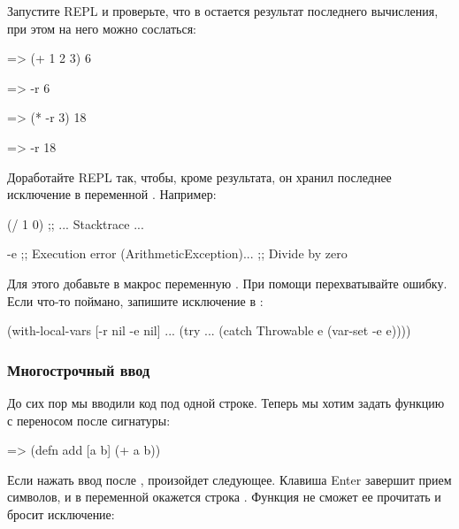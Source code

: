 Запустите REPL и проверьте, что в  остается результат последнего вычисления, при этом на него можно сослаться:

\begin{english}
  \begin{clojure}
=> (+ 1 2 3)
6

=> -r
6

=> (* -r 3)
18

=> -r
18
  \end{clojure}
\end{english}

Доработайте REPL так, чтобы, кроме результата, он хранил последнее исключение в переменной . Например:

\begin{english}
  \begin{clojure}
(/ 1 0)
;; ... Stacktrace ...

-e
;; Execution error (ArithmeticException)...
;; Divide by zero
  \end{clojure}
\end{english}

Для этого добавьте в макрос  переменную \code{[-e nil]}. При помощи  перехватывайте ошибку. Если что-то поймано, запишите исключение в :

\begin{english}
  \begin{clojure}
(with-local-vars [-r nil -e nil]
  ...
  (try
    ...
    (catch Throwable e
      (var-set -e e))))
  \end{clojure}
\end{english}

\subsubsection{Многострочный ввод}

До сих пор мы вводили код под одной строке. Теперь мы хотим задать функцию с переносом после сигнатуры:

\begin{english}
  \begin{clojure}
=> (defn add [a b]
    (+ a b))
  \end{clojure}
\end{english}

Если нажать ввод после \code{b]}, произойдет следующее. Клавиша Enter завершит прием символов, и в переменной окажется строка . Функция  не сможет ее прочитать и бросит исключение:

